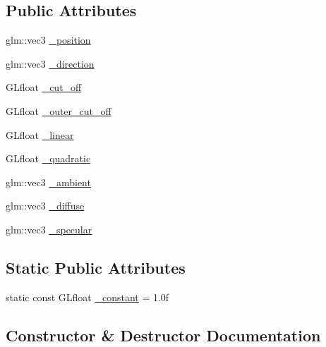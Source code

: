 \subsection*{Public Attributes}
\begin{DoxyCompactItemize}
\item 
glm\+::vec3 \hyperlink{structLarp_1_1SpotLight_a9b2973e9a3d0e791d2a64a47d21b4931}{\+\_\+position}
\item 
glm\+::vec3 \hyperlink{structLarp_1_1SpotLight_a379727dc7064b4ed966d3615c1f62e96}{\+\_\+direction}
\item 
G\+Lfloat \hyperlink{structLarp_1_1SpotLight_a3a834c8ac4551631afe4bc2d0247931c}{\+\_\+cut\+\_\+off}
\item 
G\+Lfloat \hyperlink{structLarp_1_1SpotLight_af0693fecc521fa61ce5227d4d9b39ac2}{\+\_\+outer\+\_\+cut\+\_\+off}
\item 
G\+Lfloat \hyperlink{structLarp_1_1SpotLight_a3375fb81ee2259e94e64c28832cc5d74}{\+\_\+linear}
\item 
G\+Lfloat \hyperlink{structLarp_1_1SpotLight_aec8f8db12936663096303b1acfeac209}{\+\_\+quadratic}
\item 
glm\+::vec3 \hyperlink{structLarp_1_1SpotLight_a822a42d8e8d8de3e402aa8c789673f05}{\+\_\+ambient}
\item 
glm\+::vec3 \hyperlink{structLarp_1_1SpotLight_a3709b2d7039822a74a40e127e78a2638}{\+\_\+diffuse}
\item 
glm\+::vec3 \hyperlink{structLarp_1_1SpotLight_ac77a1e5ef1ebf9f5b71bc051e5ad87f4}{\+\_\+specular}
\end{DoxyCompactItemize}
\subsection*{Static Public Attributes}
\begin{DoxyCompactItemize}
\item 
static const G\+Lfloat \hyperlink{structLarp_1_1SpotLight_a8b82cccf921fa4b4257f788bbe849320}{\+\_\+constant} = 1.\+0f
\end{DoxyCompactItemize}


\subsection{Constructor \& Destructor Documentation}
